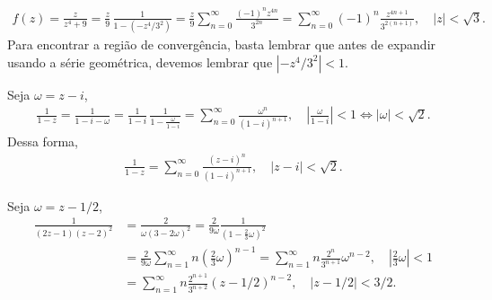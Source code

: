 \begin{questions}
\begin{solution}
    \begin{align*}
        f(z) = \frac{z}{z^4+9} = \frac{z}{9}\, \frac{1}{1-(-z^4/3^2)}
            = \frac{z}{9} \sum_{n=0}^{\infty} \frac{(-1)^n z^{4n}}{3^{2n}}
            = \sum_{n=0}^{\infty} (-1)^n \frac{z^{4n+1}}{3^{2(n+1)}},
            \quad |z| < \sqrt{3}.
    \end{align*}
    Para encontrar a região de convergência, basta lembrar que antes de expandir usando a série geométrica, devemos lembrar que $|-z^4/3^2|<1$.
\end{solution}

\begin{solution}
    Seja $\omega = z-i$,
    \begin{align*}
        \frac{1}{1 - z} = \frac{1}{1-i-\omega}
            = \frac{1}{1-i}\,\frac{1}{1 - \frac{\omega}{1-i}}
            = \sum_{n=0}^\infty \frac{\omega^n}{(1-i)^{n+1}}, \quad \left|\frac{\omega}{1-i}\right| < 1 \Leftrightarrow |\omega| < \sqrt{2}.
    \end{align*}
    Dessa forma,
    \begin{align*}
        \frac{1}{1-z} = \sum_{n=0}^\infty \frac{(z-i)^n}{(1-i)^{n+1}}, \quad |z-i| < \sqrt{2}.
    \end{align*}
\end{solution}

\setcounter{question}{13}
%
\begin{solution}
    Seja $\omega = z-1/2$,
    \begin{align*}
        \frac{1}{(2z - 1)(z - 2)^2} &= \frac{2}{\omega(3-2\omega)^2}
                = \frac{2}{9\omega} \frac{1}{(1-\frac{2}{3}\omega)^2} \\
            &= \frac{2}{9\omega} \sum_{n=1}^\infty n \left(\frac{2}{3}\omega\right)^{n-1}
                = \sum_{n=1}^\infty n \frac{2^{n}}{3^{n+1}}\omega^{n-2}, \quad |\tfrac{2}{3}\omega| < 1 \\
            &= \sum_{n=1}^\infty n \frac{2^{n+1}}{3^{n+2}}(z-1/2)^{n-2},
                \quad |z-1/2| < 3/2.
    \end{align*}
    

\end{solution}
\end{questions}
